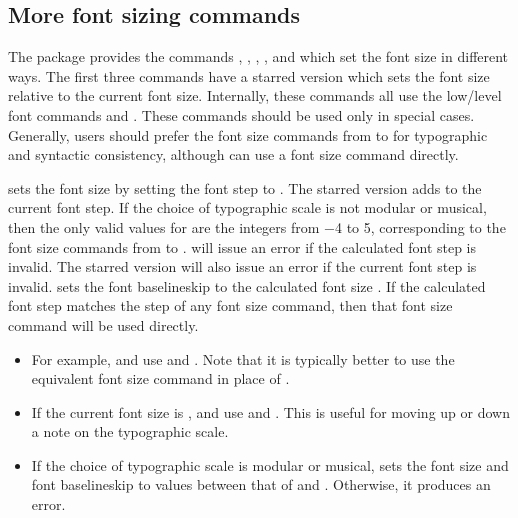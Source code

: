 \documentclass{beery}
\begin{document}
\subsection{More font sizing commands}
\label{subsec:fontsize}

The  package provides the commands , , , , and  which set the font size in different ways.
The first three commands have a starred version which sets the font size relative to the current font size.
Internally, these commands all use the low\-/level font commands  and .
These commands should be used only in special cases.
Generally, users should prefer the font size commands from  to  for typographic and syntactic consistency, although  can use a font size command directly.

\nopagebreak\newline
{}

 sets the font size by setting the font step to .
The starred version  adds  to the current font step.
If the choice of typographic scale is not modular or musical, then the only valid values for  are the integers from \num{-4} to \num{5}, corresponding to the font size commands from  to .
 will issue an error if the calculated font step is invalid.
The starred version  will also issue an error if the current font step is invalid.
 sets the font baselineskip to the calculated font size \texttimes{} .
If the calculated font step matches the step of any font size command, then that font size command will be used directly.

\begin{itemize}
  \item
  For example,  and  use  and .
  Note that it is typically better to use the equivalent font size command in place of .
  \item
  If the current font size is ,  and  use  and .
  This is useful for moving up or down a note on the typographic scale.
  \item
  If the choice of typographic scale is modular or musical,  sets the font size and font baselineskip to values between that of  and .
  Otherwise, it produces an error.
\end{itemize}
\end{document}
